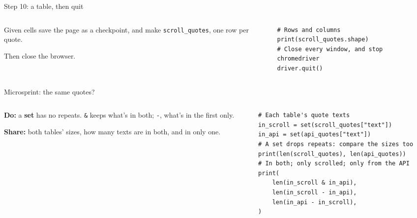 \documentclass[9pt,aspectratio=169]{beamer}
\begin{document}
\begin{frame}[fragile]{Step 10: a table, then quit}
    \begin{columns}[T]
        \begin{column}{0.37\textwidth}
            Given cells save the page as a checkpoint, and make \texttt{scroll\_quotes}, one row per quote.

            \medskip
            Then close the browser.
        \end{column}
        \begin{column}{0.6\textwidth}
\begin{lstlisting}[style=lab]
# Rows and columns
print(scroll_quotes.shape)
# Close every window, and stop chromedriver
driver.quit()
\end{lstlisting}
        \end{column}
    \end{columns}
\end{frame}

\begin{frame}[fragile]{Microsprint: the same quotes?}
    \begin{columns}[T]
        \begin{column}{0.37\textwidth}
            \textbf{Do:} a \textbf{set} has no repeats. \texttt{\&} keeps what's in both; \texttt{-}, what's in the first only.

            \medskip
            \textbf{Share:} both tables' sizes, how many texts are in both, and in only one.
        \end{column}
        \begin{column}{0.6\textwidth}
\begin{lstlisting}[style=lab]
# Each table's quote texts
in_scroll = set(scroll_quotes["text"])
in_api = set(api_quotes["text"])
# A set drops repeats: compare the sizes too
print(len(scroll_quotes), len(api_quotes))
# In both; only scrolled; only from the API
print(
    len(in_scroll & in_api),
    len(in_scroll - in_api),
    len(in_api - in_scroll),
)
\end{lstlisting}
        \end{column}
    \end{columns}
\end{frame}
\end{document}
